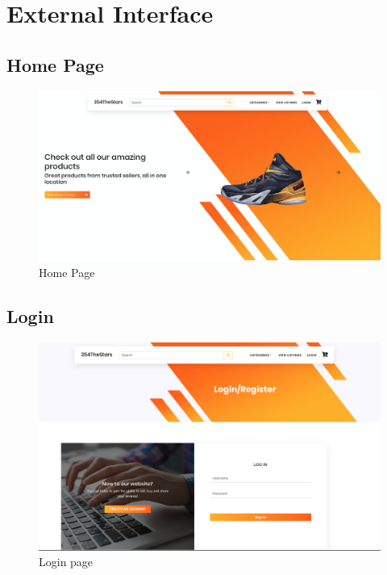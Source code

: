 \documentclass[11pt]{article}
\begin{document}
\section{External Interface}
\subsection{Home Page}
\begin{figure}[ht!]
    \centering
    \includegraphics[width=\textwidth,height=0.15\paperheight,keepaspectratio]{Diagrams/External_Interfaces/Home_Page.png} 
    \caption{Home Page}
    \label{fig: Home Page}
\end{figure}

\subsection{Login}
\begin{figure}[ht!]
    \centering
    \includegraphics[width=\textwidth,height=0.15\paperheight,keepaspectratio]{Diagrams/External_Interfaces/Login.png} 
    \caption{Login page}
    \label{fig: Login Page}
\end{figure}
\end{document}
